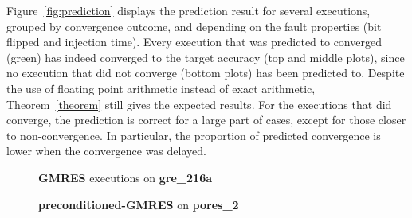 \documentclass[twoside]{article}
\newcounter{fig}\setcounter{fig}{0}
\begin{document}
  Figure~\ref{fig:prediction} displays the prediction result for several executions, grouped by convergence outcome, and depending on the fault properties (bit flipped and injection time). Every execution that was predicted to converged (green) has indeed converged to the target accuracy (top and middle plots), since no execution that did not converge (bottom plots) has been predicted to. Despite the use of floating point arithmetic instead of exact arithmetic, Theorem~\ref{theorem} still gives the expected results. For the executions that did converge, the prediction is correct for a large part of cases, except for those closer to non-convergence. In particular, the proportion of predicted convergence is lower when the convergence was delayed.
  
  \begin{figure}[H]
    \centering
    
    \begin{minipage}[b]{0.45\linewidth}
      \centering
      \textbf{GMRES} executions on \textbf{gre_216a} 
    \end{minipage}
    \quad
    \begin{minipage}{0.45\linewidth}
      \centering
      \textbf{preconditioned-GMRES} on \textbf{pores_2}
    \end{minipage}\\



\end{figure}
\end{document}
